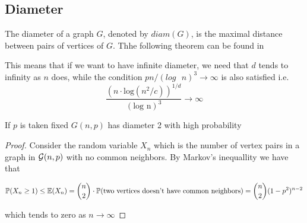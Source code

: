 







\subsection{Diameter}

The diameter of a graph $G$, denoted by $diam(G)$, is the maximal distance between pairs of vertices of $G$. Thhe following theorem can be found in \cite[Bollobás, p.259]{Bollobas}




This means that if we want to have infinite diameter, we need that $d$ tends to infinity as $n$ does, while the condition $pn/(log\text{ }n)^{3} \to \infty$ is also satisfied i.e.
$$ \frac{(n\cdot\text{log}(n^{2}/c))^{1/d}}{(\text{log n})^{3}} \to \infty$$

  

\begin{theorem}
If $p$ is taken fixed $G(n,p)$ has diameter 2 with high probability 
\end{theorem}

\begin{proof}
Consider the random variable $X_{n}$ which is the number of vertex pairs in a graph in $\mathcal{G}(n,p)$ with no common neighbors. By Markov's inequallity we have that

$$\mathbb{P}(X_{n} \geq 1)\leq \mathbb{E}(X_{n}) = \binom{n}{2} \cdot \mathbb{P}(\text{two vertices doesn't have common neighbors}) = \binom{n}{2} (1-p^{2})^{n-2}$$

which tends to zero as $n\to \infty$
\end{proof}



